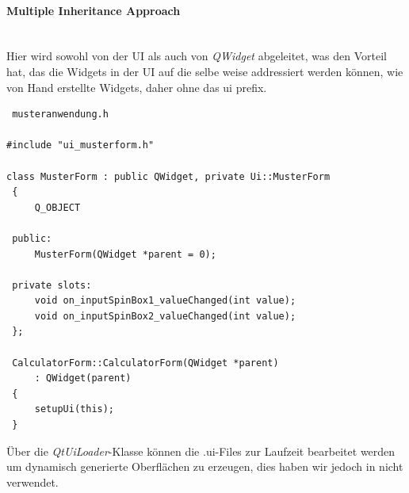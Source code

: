 \paragraph{Multiple Inheritance Approach}\mbox{}\\
Hier wird sowohl von der UI als auch von \textit{QWidget} abgeleitet, was den Vorteil hat, das die Widgets in der UI auf die selbe weise addressiert werden können, wie von Hand erstellte Widgets, daher ohne das ui prefix.
\begin{lstlisting}
 musteranwendung.h

#include "ui_musterform.h"

class MusterForm : public QWidget, private Ui::MusterForm
 {
     Q_OBJECT

 public:
     MusterForm(QWidget *parent = 0);

 private slots:
     void on_inputSpinBox1_valueChanged(int value);
     void on_inputSpinBox2_valueChanged(int value);
 };

 CalculatorForm::CalculatorForm(QWidget *parent)
     : QWidget(parent)
 {
     setupUi(this);
 }
\end{lstlisting}
Über die \textit{QtUiLoader}-Klasse können die .ui-Files zur Laufzeit bearbeitet werden um dynamisch generierte Oberflächen zu erzeugen, dies haben wir jedoch in \EBP nicht verwendet.\\
\cite{QT_UIC} 
\newpage
